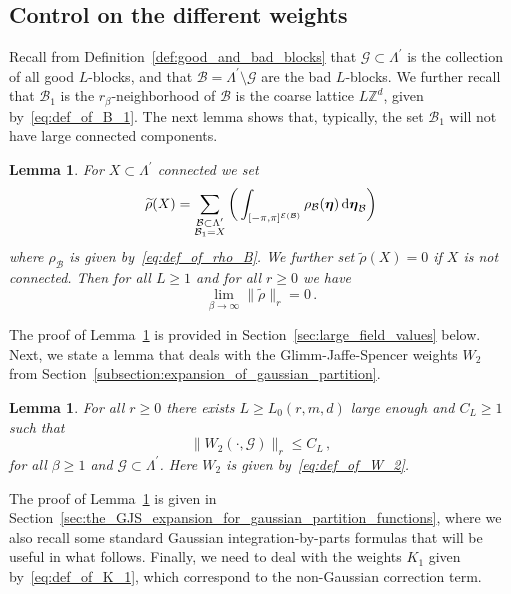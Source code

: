 \documentclass[11pt]{article}
\newtheorem{lemma}[theorem]{Lemma}
\theoremstyle{definition}
\theoremstyle{remark}
\numberwithin{theorem}{section}
\def\La{{\Lambda}}
\newcommand{\cE}{\mathcal{E}}
\newcommand{\cB}{\mathcal B}
\newcommand{\Z}{\mathbb{Z}}
\begin{document}
    \subsection{Control on the different weights}
    Recall from Definition~\ref{def:good_and_bad_blocks} that $\mathcal{G}\subset \La^\prime$ is the collection of all good $L$-blocks, and that $\mathcal{B} =  \La^\prime \setminus \mathcal{G}$ are the bad $L$-blocks. We further recall that $\cB_1$ is the $r_\beta$-neighborhood of $\mathcal{B}$ is the coarse lattice $L\Z^d$, given by~\eqref{eq:def_of_B_1}. The next lemma shows that, typically, the set $\mathcal{B}_1$ will not have large connected components.  
    \begin{lemma}
        \label{lemma:large_field_values_are_exponentially_rare}
        For $X\subset \La^\prime$ connected we set
        \begin{equation}
            \label{eq:def_of_tilde_rho}
            \widetilde{\rho}(X) = \sum_{\substack{\mathcal{B} \subset  \La^\prime \\ \mathcal{B}_1 = X}} \bigg(\int_{[-\pi,\pi]^{\mathcal{\cE(\cB)}}} \rho_{\mathcal{B}}(\boldsymbol{\eta}) \, {\rm d} \boldsymbol{\eta}_{\mathcal{B}}\bigg)
        \end{equation}
        where $\rho_\mathcal{B}$ is given by~\eqref{eq:def_of_rho_B}. We further set $ \widetilde{\rho}(X) = 0$ if $X$ is not connected. Then for all $L\ge 1$ and for all $r\ge 0$ we have
        \[
        \lim_{\beta\to\infty} \| \widetilde{\rho} \|_r = 0 \, .
        \]
    \end{lemma}
    The proof of Lemma~\ref{lemma:large_field_values_are_exponentially_rare} is provided in Section~\ref{sec:large_field_values} below. Next, we state a lemma that deals with the Glimm-Jaffe-Spencer weights $W_2$ from Section~\ref{subsection:expansion_of_gaussian_partition}.
    \begin{lemma}
        \label{lemma:GJS_weights_are_small}
        For all $r\ge 0$ there exists $L\ge L_0(r,m,d)$ large enough and $C_L\ge 1$ such that 
        \[
        \| W_2(\cdot,\mathcal{G}) \|_r \le C_{L} \, ,
        \] 
        for all $\beta\ge 1$ and $\mathcal{G}\subset \La^\prime$. Here $W_2$ is given by~\eqref{eq:def_of_W_2}.
    \end{lemma}
    \noindent
    The proof of Lemma~\ref{lemma:GJS_weights_are_small} is given in Section~\ref{sec:the_GJS_expansion_for_gaussian_partition_functions}, where we also recall some standard Gaussian integration-by-parts formulas that will be useful in what follows. Finally, we need to deal with the weights $K_1$ given by~\eqref{eq:def_of_K_1}, which correspond to the non-Gaussian correction term. 
\end{document}
